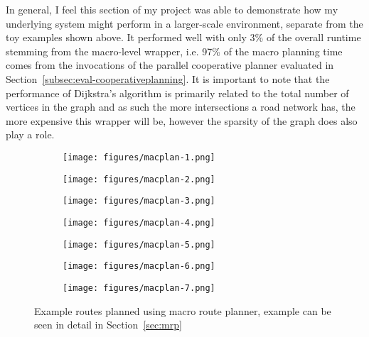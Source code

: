 In general, I feel this section of my project was able to demonstrate how my underlying system might perform in a larger-scale environment, separate from the toy examples shown above. It performed well with only 3\% of the overall runtime stemming from the macro-level wrapper, i.e. 97\% of the macro planning time comes from the invocations of the parallel cooperative planner evaluated in Section~\ref{subsec:eval-cooperativeplanning}. It is important to note that the performance of Dijkstra's algorithm is primarily related to the total number of vertices in the graph and as such the more intersections a road network has, the more expensive this wrapper will be, however the sparsity of the graph does also play a role.

\begin{figure}
  \centering
  \begin{subfigure}[b]{0.44\textwidth}
    \centering
    \texttt{[image: figures/macplan-1.png]}
    \caption{\label{subfig:macplan-1}}
  \end{subfigure}
  \begin{subfigure}[b]{0.44\textwidth}
    \centering
    \texttt{[image: figures/macplan-2.png]}
    \caption{\label{subfig:macplan-2}}
  \end{subfigure}
  \begin{subfigure}[b]{0.44\textwidth}
    \centering
    \texttt{[image: figures/macplan-3.png]}
    \caption{\label{subfig:macplan-3}}
  \end{subfigure}
  \begin{subfigure}[b]{0.44\textwidth}
    \centering
    \texttt{[image: figures/macplan-4.png]}
    \caption{\label{subfig:macplan-4}}
  \end{subfigure}
  \begin{subfigure}[b]{0.44\textwidth}
    \centering
    \texttt{[image: figures/macplan-5.png]}
    \caption{\label{subfig:macplan-5}}
  \end{subfigure}
  \begin{subfigure}[b]{0.44\textwidth}
    \centering
    \texttt{[image: figures/macplan-6.png]}
    \caption{\label{subfig:macplan-6}}
  \end{subfigure}
  \begin{subfigure}[b]{0.44\textwidth}
    \centering
    \texttt{[image: figures/macplan-7.png]}
    \caption{\label{subfig:macplan-7}}
  \end{subfigure}
  \caption{\label{fig:macro--plans} Example routes planned using macro route planner, example can be seen in detail in Section~\ref{sec:mrp} }
\end{figure}


